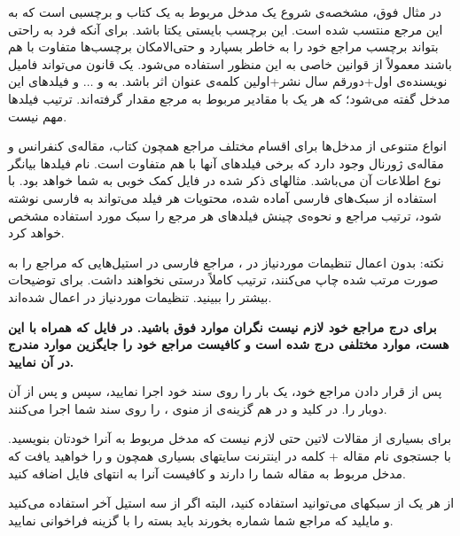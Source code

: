 در مثال فوق،  مشخصه‌ی شروع یک مدخل مربوط به یک کتاب و  برچسبی است که به این مرجع منتسب شده است.
 این برچسب بایستی یکتا باشد. برای آنکه فرد به راحتی بتواند برچسب مراجع خود را به خاطر بسپارد و حتی‌الامکان برچسب‌ها متفاوت با هم باشند معمولاً از قوانین خاصی به این منظور استفاده می‌شود. یک قانون می‌تواند فامیل نویسنده‌ی اول+دورقم سال نشر+اولین کلمه‌ی عنوان اثر باشد. به  و $\dots$ و  فیلدهای این مدخل گفته می‌شود؛ که هر یک با مقادیر مربوط به مرجع مقدار گرفته‌اند. ترتیب فیلدها مهم نیست. 

انواع متنوعی از مدخل‌ها برای اقسام مختلف مراجع همچون کتاب، مقاله‌ی کنفرانس و مقاله‌ی ژورنال وجود دارد که برخی فیلدهای آنها با هم متفاوت است. 
نام فیلدها بیانگر نوع اطلاعات آن می‌باشد. مثالهای ذکر شده در فایل  کمک خوبی به شما خواهد بود. 
با استفاده از سبک‌های فارسی آماده شده، محتویات هر فیلد می‌تواند به فارسی نوشته شود، ترتیب مراجع و نحوه‌ی چینش فیلدهای هر مرجع را سبک مورد استفاده  مشخص خواهد کرد.

نکته: بدون اعمال تنظیمات موردنیاز  در ، مراجع فارسی در استیل‌هایی که مراجع را به صورت مرتب شده چاپ می‌کنند، ترتیب کاملاً درستی نخواهند داشت. برای توضیحات بیشتر \cite{persianbib87userguide} را ببینید. تنظیمات موردنیاز در  اعمال شده‌اند.

\textbf{برای درج مراجع خود لازم نیست نگران موارد فوق باشید. در فایل 
 که همراه با این \پ هست، موارد مختلفی درج شده است و کافیست مراجع خود را جایگزین موارد مندرج در آن نمایید.
}

پس از قرار دادن مراجع خود، یک بار  را روی سند خود اجرا نمایید، سپس  و پس از آن دوبار  را. در 
 کلید  و در  هم گزینه‌ی  از منوی ،  را روی سند شما اجرا می‌کنند.

برای بسیاری از مقالات لاتین حتی لازم نیست که مدخل مربوط به آنرا خودتان بنویسید. با جستجوی نام مقاله + کلمه   در اینترنت سایتهای بسیاری همچون  و  را خواهید یافت که مدخل  مربوط به مقاله شما را دارند و کافیست آنرا به انتهای فایل  اضافه کنید.

از هر یک از سبکهای  می‌توانید استفاده کنید، البته اگر از سه استیل آخر استفاده می‌کنید و مایلید که مراجع شما شماره بخورند باید بسته  را با گزینه  فراخوانی نمایید.
